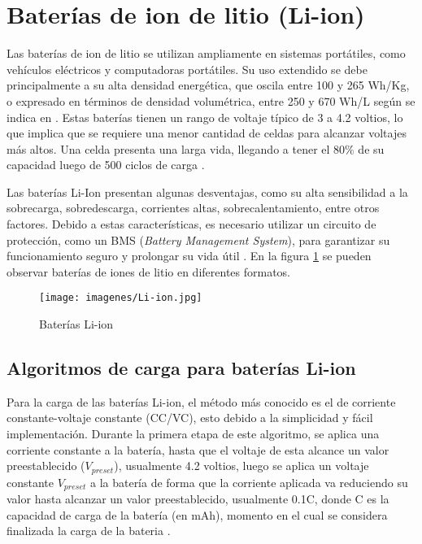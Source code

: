 \section{Baterías de ion de litio (Li-ion)}

Las baterías de ion de litio se utilizan ampliamente en sistemas portátiles,
 como vehículos eléctricos y computadoras portátiles. Su uso extendido se 
 debe principalmente a su alta densidad energética, que oscila entre 100 y 265 Wh/Kg,
  o expresado en términos de densidad volumétrica, entre 250 y 670 Wh/L según se indica en 
  \cite{noauthor_lithium-ion_nodate}. Estas baterías tienen un rango de voltaje típico de
   3 a 4.2 voltios, lo que implica que se requiere una menor cantidad de celdas para
alcanzar voltajes más altos. Una celda presenta una larga vida, llegando a tener el 80\%
de su capacidad luego de 500 ciclos de carga \cite{texas_instrumens_multi-chemistry_2022}.

Las baterías Li-Ion presentan algunas desventajas, como su alta sensibilidad a la sobrecarga,
sobredescarga, corrientes altas, sobrecalentamiento, entre otros factores. Debido a estas características,
es necesario utilizar un circuito de protección, como un BMS (\textit{Battery Management System}), para garantizar
su funcionamiento seguro y prolongar su vida útil \cite{texas_instrumens_multi-chemistry_2022}. En la figura 
\ref{fig:liion} se pueden observar baterías de iones de litio en diferentes formatos.

\begin{figure}[H]
   \centering
   \texttt{[image: imagenes/Li-ion.jpg]}
   \caption{Baterías Li-ion \cite{mk2010_english_2012} }
   \label{fig:liion}
\end{figure}


\subsection{Algoritmos de carga para baterías Li-ion}

Para la carga de las baterías Li-ion, el método más conocido es el de corriente constante-voltaje constante (CC/VC), esto 
debido a la simplicidad y fácil implementación. Durante la primera etapa de este algoritmo, se aplica una corriente constante
a la batería, hasta que el voltaje de esta alcance un valor preestablecido ($V_{preset}$), usualmente 4.2 voltios, luego se aplica 
un voltaje constante $V_{preset}$ a la batería de forma que la corriente aplicada va reduciendo su valor hasta alcanzar un valor
preestablecido, usualmente 0.1C, donde C es la capacidad de carga de la batería (en mAh), momento en el cual se considera finalizada la 
carga de la bateria \cite{shen_charging_2012}.

